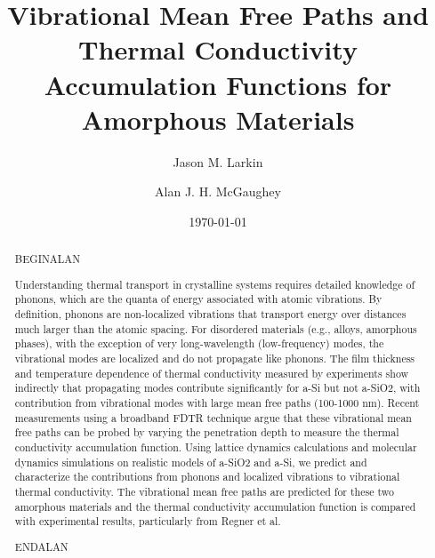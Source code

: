 \documentclass[aps,prb,twocolumn,superscriptaddress,footinbib,amsmath,amssymb,floatfix]{revtex4}
\begin{document}
\title{Vibrational Mean Free Paths and Thermal Conductivity 
Accumulation Functions for Amorphous Materials}
\author{Jason M. Larkin}
\author{Alan J. H. McGaughey}
\date{\today}
\begin{abstract}

BEGINALAN

Understanding thermal transport in crystalline systems requires detailed 
knowledge of phonons, which are the quanta of energy associated with atomic 
vibrations. By definition, phonons are non-localized vibrations that 
transport energy over distances much larger than the atomic spacing. For 
disordered materials (e.g., alloys, amorphous phases), with the exception 
of very long-wavelength (low-frequency) modes, the vibrational modes are 
localized and do 
not propagate like phonons. The film thickness and temperature dependence 
of thermal conductivity measured by experiments show indirectly that 
propagating modes contribute 
significantly for a-Si but not a-SiO2, with contribution from vibrational 
modes with large mean free paths (100-1000 nm). Recent measurements using a 
broadband FDTR technique argue that these vibrational mean free paths can 
be probed by varying the penetration depth to measure the 
thermal conductivity accumulation function. 
Using lattice dynamics calculations and molecular dynamics simulations on 
realistic models of a-SiO2 and a-Si, we predict and 
characterize the contributions from phonons and localized vibrations to 
vibrational thermal conductivity. The vibrational mean free paths are 
predicted for these two amorphous materials and the thermal 
conductivity accumulation function is compared with experimental 
results, particularly from Regner et al. 

ENDALAN

\end{abstract}
\maketitle
\clearpage
\end{document}
